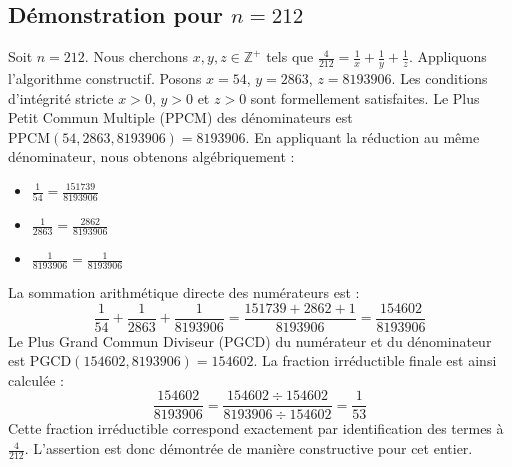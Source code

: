 \documentclass[11pt,a4paper]{article}
\begin{document}
\subsection{Démonstration pour $n = 212$}
Soit $n = 212$. Nous cherchons $x, y, z \in \mathbb{Z}^{+}$ tels que $\frac{4}{212} = \frac{1}{x} + \frac{1}{y} + \frac{1}{z}$.
Appliquons l'algorithme constructif. Posons $x = 54$, $y = 2863$, $z = 8193906$.
Les conditions d'intégrité stricte $x > 0$, $y > 0$ et $z > 0$ sont formellement satisfaites.
Le Plus Petit Commun Multiple (PPCM) des dénominateurs est $\text{PPCM}(54, 2863, 8193906) = 8193906$.
En appliquant la réduction au même dénominateur, nous obtenons algébriquement :
\begin{itemize}
    \item $\frac{1}{54} = \frac{151739}{8193906}$
    \item $\frac{1}{2863} = \frac{2862}{8193906}$
    \item $\frac{1}{8193906} = \frac{1}{8193906}$
\end{itemize}
La sommation arithmétique directe des numérateurs est :
$$ \frac{1}{54} + \frac{1}{2863} + \frac{1}{8193906} = \frac{151739 + 2862 + 1}{8193906} = \frac{154602}{8193906} $$
Le Plus Grand Commun Diviseur (PGCD) du numérateur et du dénominateur est $\text{PGCD}(154602, 8193906) = 154602$.
La fraction irréductible finale est ainsi calculée :
$$ \frac{154602}{8193906} = \frac{154602 \div 154602}{8193906 \div 154602} = \frac{1}{53} $$
Cette fraction irréductible correspond exactement par identification des termes à $\frac{4}{212}$. L'assertion est donc démontrée de manière constructive pour cet entier.
\end{document}
